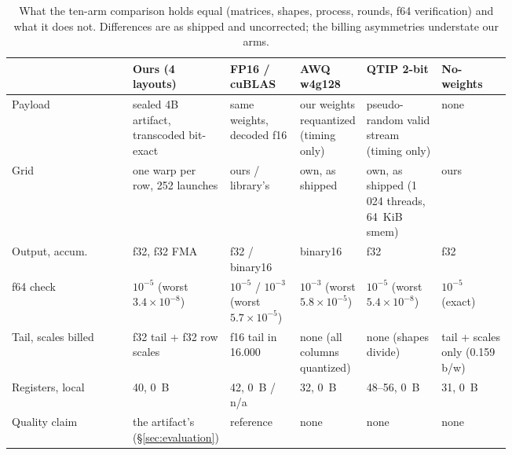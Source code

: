 \begin{table}[H]
\centering
\scriptsize
\setlength{\tabcolsep}{3pt}
\renewcommand{\arraystretch}{0.85}
\begin{tabular}{lp{0.175\linewidth}p{0.14\linewidth}p{0.135\linewidth}p{0.15\linewidth}p{0.14\linewidth}}
\toprule
 & Ours (4 layouts) & FP16 / cuBLAS & AWQ w4g128 & QTIP 2-bit & No-weights \\
\midrule
Payload & sealed 4B artifact, transcoded bit-exact & same weights, decoded f16 & our weights requantized (timing only) & pseudo-random valid stream (timing only) & none \\
Grid & one warp per row, 252 launches & ours / library's & own, as shipped & own, as shipped (1\,024 threads, 64~KiB smem) & ours \\
Output, accum. & f32, f32 FMA & f32 / binary16 & binary16 & f32 & f32 \\
f64 check & $10^{-5}$ (worst $3.4\times10^{-8}$) & $10^{-5}$ / $10^{-3}$ (worst $5.7\times10^{-5}$) & $10^{-3}$ (worst $5.8\times10^{-5}$) & $10^{-5}$ (worst $5.4\times10^{-8}$) & $10^{-5}$ (exact) \\
Tail, scales billed & f32 tail + f32 row scales & f16 tail in 16.000 & none (all columns quantized) & none (shapes divide) & tail + scales only (0.159 b/w) \\
Registers, local & 40, 0~B & 42, 0~B / n/a & 32, 0~B & 48--56, 0~B & 31, 0~B \\
Quality claim & the artifact's (\S\ref{sec:evaluation}) & reference & none & none & none \\
\bottomrule
\end{tabular}
\caption{What the ten-arm comparison holds equal (matrices, shapes,
process, rounds, f64 verification) and what it does not. Differences are as
shipped and uncorrected; the billing asymmetries understate our arms.}
\label{tab:fairness}
\end{table}

